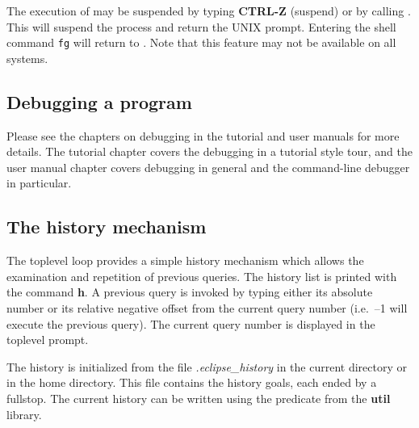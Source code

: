 The execution of {\eclipse} may be suspended by typing {\bf CTRL-Z} 
(suspend) or by calling .
This will suspend the {\eclipse} process and return the UNIX prompt. 
Entering the shell command {\tt fg} will return to {\eclipse}.
Note that this feature may not be available on all systems.

\subsection{Debugging a program}

Please see the chapters on debugging in the tutorial and user manuals for
more details. The tutorial chapter covers the {\tkeclipse} debugging in a
tutorial style tour, and the user manual chapter covers 
 debugging in
general and the command-line debugger in particular.

\subsection{The history mechanism}
The {\eclipse} toplevel loop provides a simple history mechanism which allows
the examination and repetition of previous queries.
The history list is printed with the command {\bf h}.
A previous query is invoked by typing either its absolute number or its
relative negative offset from the current query number (i.e.\ --1 will
execute the previous query).
The current query number is displayed in the toplevel prompt.

The history is initialized from the file {\it .eclipse_history}
in the current directory or in the home directory.
This file contains the history goals, each ended by a fullstop.
The current history can be written using the predicate
 from the
{\bf util} library.

